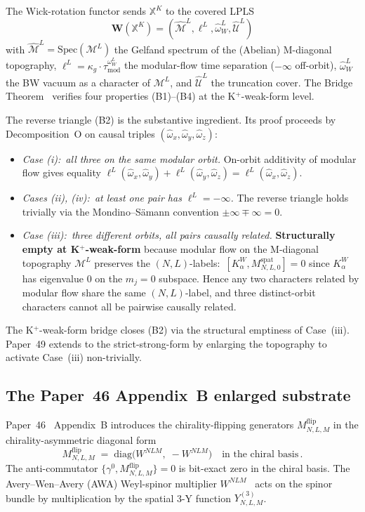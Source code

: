\documentclass[11pt,a4paper]{article}
\theoremstyle{plain}
\theoremstyle{definition}
\newcommand{\Mcal}{\mathcal{M}}
\newcommand{\Ucal}{\mathcal{U}}
\newcommand{\Wfun}{\mathbf{W}}
\newcommand{\BWvac}{\omega_{W}^{L}}
\newcommand{\Kalpha}{K_{\alpha}^{W}}
\newcommand{\tmod}{\tau_{\mathrm{mod}}}
\newcommand{\kappag}{\kappa_{g}}
\newcommand{\Mflip}[3]{M^{\mathrm{flip}}_{#1,#2,#3}}
\newcommand{\Mspat}[3]{M^{\mathrm{spat}}_{#1,#2,#3}}
\newcommand{\Wspat}[3]{W^{#1#2#3}}
\begin{document}
The Wick-rotation functor sends $\mathbb{X}^{K}$ to the covered LPLS
\[
  \Wfun(\mathbb{X}^{K}) = (\hat{\Mcal}^{L},\ell^{L},\hat{\omega}_{W}^{L},\hat{\Ucal}^{L})
\]
with $\hat{\Mcal}^{L}=\mathrm{Spec}(\Mcal^{L})$ the Gelfand spectrum
of the (Abelian) M-diagonal topography, $\ell^{L}=\kappag\cdot
\tmod^{\BWvac}$ the modular-flow time separation ($-\infty$
off-orbit), $\hat{\omega}_{W}^{L}$ the BW vacuum as a character of
$\Mcal^{L}$, and $\hat{\Ucal}^{L}$ the truncation cover. The Bridge
Theorem~\cite[Theorem~6.4]{paper48} verifies four properties
(B1)--(B4) at the K$^{+}$-weak-form level.

The reverse triangle (B2) is the substantive ingredient. Its proof
proceeds by Decomposition~O on causal triples
$(\hat{\omega}_{x},\hat{\omega}_{y},\hat{\omega}_{z})$:
\begin{itemize}
\item \emph{Case (i):\ all three on the same modular orbit.}
On-orbit additivity of modular flow gives equality
$\ell^{L}(\hat{\omega}_{x},\hat{\omega}_{y})+
\ell^{L}(\hat{\omega}_{y},\hat{\omega}_{z})=
\ell^{L}(\hat{\omega}_{x},\hat{\omega}_{z})$.
\item \emph{Cases (ii), (iv):\ at least one pair has
$\ell^{L}=-\infty$.} The reverse triangle holds trivially via the
Mondino--S\"amann convention $\pm\infty\mp\infty=0$.
\item \emph{Case (iii):\ three different orbits, all pairs causally
related.} \textbf{Structurally empty at K$^{+}$-weak-form} because
modular flow on the M-diagonal topography $\Mcal^{L}$ preserves the
$(N,L)$-labels:\ $[\Kalpha,\Mspat{N}{L}{0}]=0$ since $\Kalpha$ has
eigenvalue $0$ on the $m_{j}=0$ subspace. Hence any two characters
related by modular flow share the same $(N,L)$-label, and three
distinct-orbit characters cannot all be pairwise causally related.
\end{itemize}

The K$^{+}$-weak-form bridge closes (B2) via the structural emptiness
of Case~(iii). Paper~49 extends to the strict-strong-form by enlarging
the topography to activate Case~(iii) non-trivially.

\subsection{The Paper~46 Appendix~B enlarged substrate}
\label{sec:enlarged_substrate_recap}

Paper~46~\cite{paper46} Appendix~B introduces the chirality-flipping
generators $\Mflip{N}{L}{M}$ in the chirality-asymmetric diagonal form
\begin{equation}
  \Mflip{N}{L}{M} \;=\; \mathrm{diag}\!\big(\Wspat{N}{L}{M},\;-\Wspat{N}{L}{M}\big)\quad\text{in the chiral basis}\,.
  \label{eq:flip_generator_form}
\end{equation}
The anti-commutator $\{\gamma^{0},\Mflip{N}{L}{M}\}=0$ is bit-exact
zero in the chiral basis. The Avery--Wen--Avery (AWA) Weyl-spinor
multiplier $\Wspat{N}{L}{M}$~\cite{paper44} acts on the spinor bundle
by multiplication by the spatial 3-Y function $Y^{(3)}_{N,L,M}$.
\end{document}
